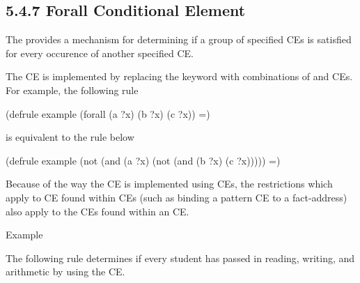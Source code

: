 \documentclass[letterpaper,10pt,english]{sphinxmanual}
\begin{document}
\subsection{5.4.7 Forall Conditional Element}
\label{\detokenize{defrule:forall-conditional-element}}
The   provides a mechanism for
determining if a group of specified CEs is satisfied for every occurence
of another specified CE.


\begin{sphinxVerbatim}[commandchars=\\\{\}]
   
\end{sphinxVerbatim}

The  CE is implemented by replacing the  keyword
with combinations of  and  CEs. For example, the following
rule

\begin{sphinxVerbatim}[commandchars=\\\{\}]
(defrule example
  (forall (a ?x) (b ?x) (c ?x))
  =\PYGZgt{})
\end{sphinxVerbatim}

is equivalent to the rule below

\begin{sphinxVerbatim}[commandchars=\\\{\}]
(defrule example
  (not (and (a ?x)
  (not (and (b ?x) (c ?x)))))
  =\PYGZgt{})
\end{sphinxVerbatim}

Because of the way the  CE is implemented using  CEs,
the restrictions which apply to CE found within  CEs (such as
binding a pattern CE to a fact-address) also apply to the CEs found
within an  CE.

Example

The following rule determines if every student has passed in reading,
writing, and arithmetic by using the  CE.
\end{document}
